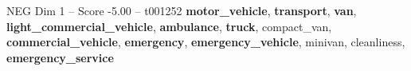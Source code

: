 \begin{textsample}{NEG Dim 1 – Score -5.00 – t001252}  \label{ex:f1_neg_010}
\textbf{motor\_vehicle}, \textbf{transport}, \textbf{van}, \textbf{light\_commercial\_vehicle}, \textbf{ambulance}, \textbf{truck}, compact\_van, \textbf{commercial\_vehicle}, \textbf{emergency}, \textbf{emergency\_vehicle}, minivan, cleanliness, \textbf{emergency\_service}

\end{textsample}
